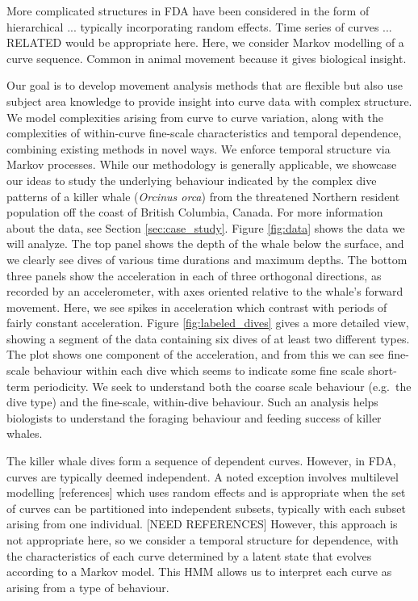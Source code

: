 More complicated structures in FDA have been considered in the form of hierarchical ...  typically incorporating random effects.
Time series of curves  ...  RELATED would be appropriate here.
Here, we consider Markov modelling of a curve sequence.  Common in animal movement because it gives biological insight.

Our goal is to develop movement analysis methods that are flexible but also use subject area knowledge to provide insight into curve data with complex structure.
We  model complexities arising  from curve to curve variation, along with the complexities of within-curve fine-scale characteristics and temporal dependence,
combining existing methods in novel ways.
We enforce temporal structure via Markov processes.  
While our methodology is generally applicable, we  showcase our ideas to study the underlying behaviour indicated by the complex dive patterns of a killer whale (\textit{Orcinus orca}) from the threatened Northern resident population off the coast of British Columbia, Canada.  
For more information about the data, see Section \ref{sec:case_study}.
Figure \ref{fig:data} shows the data we will analyze.
The top panel shows the depth of the whale below the surface, and we clearly see dives of various time durations and maximum depths. 
The bottom three panels show the acceleration in each of three orthogonal directions, as recorded by an accelerometer,   
with axes oriented relative to the whale's forward movement.
Here, we see spikes in acceleration which contrast with periods of fairly constant acceleration.
Figure {\ref{fig:labeled_dives}} gives a more detailed view, showing a segment of the data containing six dives of at least two different types.
The plot shows one component of the acceleration, and from this we can see fine-scale behaviour within each dive which seems to indicate some fine scale short-term periodicity. 
We seek to understand both the coarse scale behaviour (e.g.~the dive type) and the fine-scale, within-dive behaviour. 
Such an analysis helps biologists to understand the foraging behaviour and feeding success of killer whales. 

The killer whale dives form a sequence of dependent curves. However, in FDA, curves are typically deemed independent.  
A noted exception involves multilevel modelling [references] which uses random effects and is appropriate when the set of curves can be partitioned into independent subsets, typically with each subset arising from one individual.  
[NEED REFERENCES]  
However, this approach is not appropriate here, so we consider a temporal structure for dependence, with the characteristics of each curve determined by a latent state that evolves according to a Markov model.  
This HMM allows us to interpret each curve as arising from a type of behaviour.

